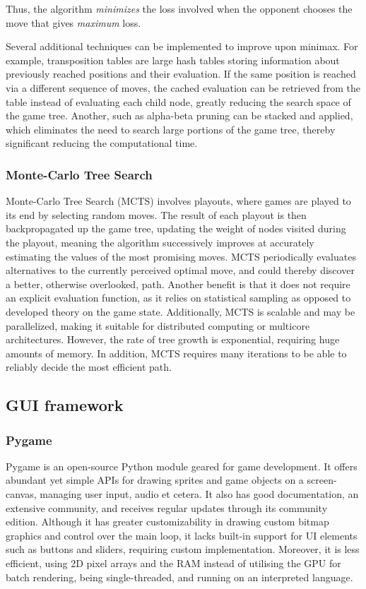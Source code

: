 \documentclass[../main/main.tex]{subfiles}
\begin{document}
Thus, the algorithm \textit{minimizes} the loss involved when the opponent chooses the move that gives \textit{maximum} loss.

Several additional techniques can be implemented to improve upon minimax. For example, transposition tables are large hash tables storing information about previously reached positions and their evaluation. If the same position is reached via a different sequence of moves, the cached evaluation can be retrieved from the table instead of evaluating each child node, greatly reducing the search space of the game tree. Another, such as alpha-beta pruning can be stacked and applied, which eliminates the need to search large portions of the game tree, thereby significant reducing the computational time.

\subsubsection*{Monte-Carlo Tree Search}
Monte-Carlo Tree Search (MCTS) involves playouts, where games are played to its end by selecting random moves. The result of each playout is then backpropagated up the game tree, updating the weight of nodes visited during the playout, meaning the algorithm successively improves at accurately estimating the values of the most promising moves. MCTS periodically evaluates alternatives to the currently perceived optimal move, and could thereby discover a better, otherwise overlooked, path. Another benefit is that it does not require an explicit evaluation function, as it relies on statistical sampling as opposed to developed theory on the game state. Additionally, MCTS is scalable and may be parallelized, making it suitable for distributed computing or multicore architectures. However, the rate of tree growth is exponential, requiring huge amounts of memory. In addition, MCTS requires many iterations to be able to reliably decide the most efficient path.

\subsection{GUI framework}
\subsubsection*{Pygame}
Pygame is an open-source Python module geared for game development. It offers abundant yet simple APIs for drawing sprites and game objects on a screen-canvas, managing user input, audio et cetera. It also has good documentation, an extensive community, and receives regular updates through its community edition. Although it has greater customizability in drawing custom bitmap graphics and control over the main loop, it lacks built-in support for UI elements such as buttons and sliders, requiring custom implementation. Moreover, it is less efficient, using 2D pixel arrays and the RAM instead of utilising the GPU for batch rendering, being single-threaded, and running on an interpreted language.
\end{document}
